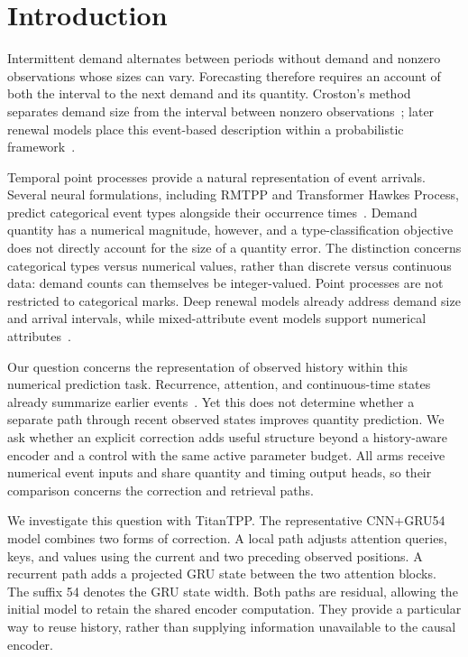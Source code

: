\documentclass[runningheads]{llncs}
\newcommand{\method}{TitanTPP}
\begin{document}
\section{Introduction}
Intermittent demand alternates between periods without demand and nonzero observations whose sizes can vary.
Forecasting therefore requires an account of both the interval to the next demand and its quantity.
Croston's method separates demand size from the interval between nonzero observations~\cite{croston1972forecasting};
later renewal models place this event-based description within a probabilistic framework~\cite{turkmen2021renewal}.

Temporal point processes provide a natural representation of event arrivals.
Several neural formulations, including RMTPP and Transformer Hawkes Process, predict categorical event types alongside their occurrence times~\cite{du2016rmtpp,zuo2020thp}.
Demand quantity has a numerical magnitude, however, and a type-classification objective does not directly account for the size of a quantity error.
The distinction concerns categorical types versus numerical values, rather than discrete versus continuous data: demand counts can themselves be integer-valued.
Point processes are not restricted to categorical marks.
Deep renewal models already address demand size and arrival intervals, while mixed-attribute event models support numerical attributes~\cite{turkmen2021renewal,draxler2025flextpp}.

Our question concerns the representation of observed history within this numerical prediction task.
Recurrence, attention, and continuous-time states already summarize earlier events~\cite{mei2017nhp,yang2022anhp,chang2025s2p2}.
Yet this does not determine whether a separate path through recent observed states improves quantity prediction.
We ask whether an explicit correction adds useful structure beyond a history-aware encoder and a control with the same active parameter budget.
All arms receive numerical event inputs and share quantity and timing output heads, so their comparison concerns the correction and retrieval paths.

We investigate this question with \method.
The representative CNN+GRU54 model combines two forms of correction.
A local path adjusts attention queries, keys, and values using the current and two preceding observed positions.
A recurrent path adds a projected GRU state between the two attention blocks.
The suffix 54 denotes the GRU state width.
Both paths are residual, allowing the initial model to retain the shared encoder computation.
They provide a particular way to reuse history, rather than supplying information unavailable to the causal encoder.
\end{document}
